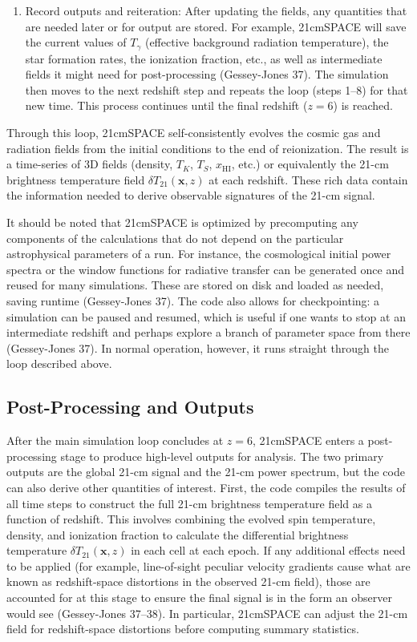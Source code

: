 \documentclass[floats,floatfix,showpacs,amssymb,prd,superscriptaddress,nofootinbib]{revtex4-2} %
\begin{document}
\begin{enumerate}
    \item Record outputs and reiteration: After updating the fields, any quantities that are needed later or for output are stored. For example, 21cmSPACE will save the current values of $T_\gamma$ (effective background radiation temperature), the star formation rates, the ionization fraction, etc., as well as intermediate fields it might need for post-processing (Gessey-Jones 37). The simulation then moves to the next redshift step and repeats the loop (steps 1–8) for that new time. This process continues until the final redshift ($z=6$) is reached.
\end{enumerate}

Through this loop, 21cmSPACE self-consistently evolves the cosmic gas and radiation fields from the initial conditions to the end of reionization. The result is a time-series of 3D fields (density, $T_K$, $T_S$, $x_{\mathrm{HI}}$, etc.) or equivalently the 21-cm brightness temperature field $\delta T_{21}(\mathbf{x}, z)$ at each redshift. These rich data contain the information needed to derive observable signatures of the 21-cm signal.

It should be noted that 21cmSPACE is optimized by precomputing any components of the calculations that do not depend on the particular astrophysical parameters of a run. For instance, the cosmological initial power spectra or the window functions for radiative transfer can be generated once and reused for many simulations. These are stored on disk and loaded as needed, saving runtime (Gessey-Jones 37). The code also allows for checkpointing: a simulation can be paused and resumed, which is useful if one wants to stop at an intermediate redshift and perhaps explore a branch of parameter space from there (Gessey-Jones 37). In normal operation, however, it runs straight through the loop described above.

\subsection{Post-Processing and Outputs}

After the main simulation loop concludes at $z=6$, 21cmSPACE enters a post-processing stage to produce high-level outputs for analysis. The two primary outputs are the global 21-cm signal and the 21-cm power spectrum, but the code can also derive other quantities of interest. First, the code compiles the results of all time steps to construct the full 21-cm brightness temperature field as a function of redshift. This involves combining the evolved spin temperature, density, and ionization fraction to calculate the differential brightness temperature $\delta T_{21}(\mathbf{x}, z)$ in each cell at each epoch. If any additional effects need to be applied (for example, line-of-sight peculiar velocity gradients cause what are known as redshift-space distortions in the observed 21-cm field), those are accounted for at this stage to ensure the final signal is in the form an observer would see (Gessey-Jones 37–38). In particular, 21cmSPACE can adjust the 21-cm field for redshift-space distortions before computing summary statistics. 
\end{document}
